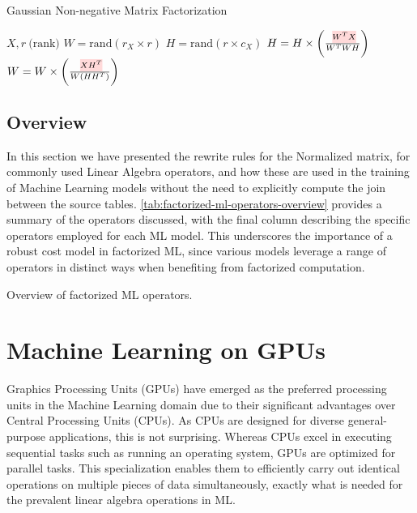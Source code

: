 \begin{algorithm}[ht]
  \caption[Gaussian NMF]{Gaussian Non-negative Matrix Factorization
    ~\cite{morpheus}}\label{alg:gaussian-nmf}
  \begin{algorithmic}
    \Require $X, r\ \text{(rank)}$
    \State $W = \text{rand}(r_X \times r)$ 
    \State $H = \text{rand}(r \times c_X)$ 
    \State $H = H \times \left(\frac{\text{\red{$W^T X$}}}{W^T W H}\right)$
    \State $W = W \times \left(\frac{\text{\red{$X H^T$}}}{W(H H^T)}\right)$
    \EndFor
  \end{algorithmic}
\end{algorithm}


\subsection{Overview}
\label{subsec:factorized-ml-summary}
In this section we have presented the rewrite rules for the Normalized matrix, for commonly used Linear Algebra operators, and how these are used in the training of Machine Learning models without the need to explicitly compute the join between the source tables. \autoref{tab:factorized-ml-operators-overview}  provides a summary of the operators discussed, with the final column describing the specific operators employed for each ML model. This underscores the importance of a robust cost model in factorized ML, since various models leverage a range of operators in distinct ways when benefiting from factorized computation.

\begin{table}[ht]
  \small
  \resizebox{\textwidth}{!}{%
    }
  \caption{Overview of factorized ML operators.}
  \label{tab:factorized-ml-operators-overview}
\end{table}

\section{Machine Learning on GPUs}
\label{sec:2-ml-on-gpu}
Graphics Processing Units (GPUs) have emerged as the preferred processing units in the Machine Learning domain due to their significant advantages over Central Processing Units (CPUs). As CPUs are designed for diverse general-purpose applications, this is not surprising. Whereas CPUs excel in executing sequential tasks such as running an operating system, GPUs are optimized for parallel tasks. This specialization enables them to efficiently carry out identical operations on multiple pieces of data simultaneously, exactly what is needed for the prevalent linear algebra operations in ML.

